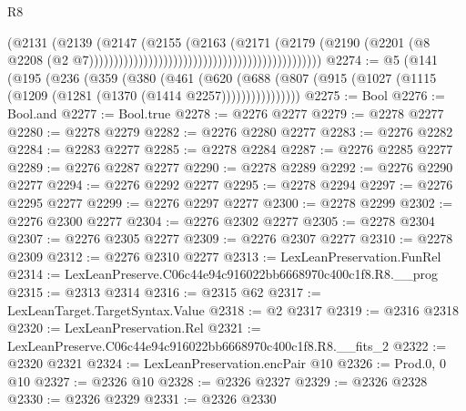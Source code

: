 \begin{lexlean}{R8}
\begin{coremodule}
                                                                            (@2131
                                                                              (@2139
                                                                                (@2147
                                                                                  (@2155
                                                                                    (@2163
                                                                                      (@2171
                                                                                        (@2179
                                                                                          (@2190
                                                                                            (@2201
                                                                                              (@8
                                                                                                @2208
                                                                                                (@2
                                                                                                  @7)))))))))))))))))))))))))))))))))))))))))))))))
@2274 := @5
    (@141
      (@195
        (@236
          (@359
            (@380
              (@461
                (@620
                  (@688 (@807 (@915 (@1027 (@1115 (@1209 (@1281 (@1370 (@1414 @2257))))))))))))))))
@2275 := Bool
@2276 := Bool.and
@2277 := Bool.true
@2278 := @2276 @2277
@2279 := @2278 @2277
@2280 := @2278 @2279
@2282 := @2276 @2280 @2277
@2283 := @2276 @2282
@2284 := @2283 @2277
@2285 := @2278 @2284
@2287 := @2276 @2285 @2277
@2289 := @2276 @2287 @2277
@2290 := @2278 @2289
@2292 := @2276 @2290 @2277
@2294 := @2276 @2292 @2277
@2295 := @2278 @2294
@2297 := @2276 @2295 @2277
@2299 := @2276 @2297 @2277
@2300 := @2278 @2299
@2302 := @2276 @2300 @2277
@2304 := @2276 @2302 @2277
@2305 := @2278 @2304
@2307 := @2276 @2305 @2277
@2309 := @2276 @2307 @2277
@2310 := @2278 @2309
@2312 := @2276 @2310 @2277
@2313 := LexLeanPreservation.FunRel
@2314 := LexLeanPreserve.C06c44e94c916022bb6668970c400c1f8.R8.__prog
@2315 := @2313 @2314
@2316 := @2315 @62
@2317 := LexLeanTarget.TargetSyntax.Value
@2318 := @2 @2317
@2319 := @2316 @2318
@2320 := LexLeanPreservation.Rel
@2321 := LexLeanPreserve.C06c44e94c916022bb6668970c400c1f8.R8.__fits_2
@2322 := @2320 @2321
@2324 := LexLeanPreservation.encPair @10
@2326 := Prod.{0, 0} @10
@2327 := @2326 @10
@2328 := @2326 @2327
@2329 := @2326 @2328
@2330 := @2326 @2329
@2331 := @2326 @2330

\end{coremodule}
\end{lexlean}
